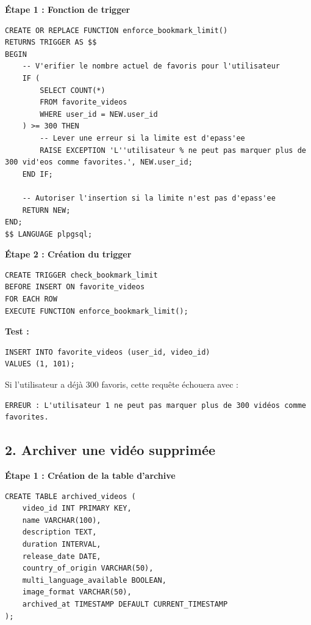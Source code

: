 \documentclass[a4paper, 12pt]{article}
\begin{document}
\textbf{Étape 1 : Fonction de trigger}

\begin{lstlisting}
CREATE OR REPLACE FUNCTION enforce_bookmark_limit()
RETURNS TRIGGER AS $$
BEGIN
    -- V'erifier le nombre actuel de favoris pour l'utilisateur
    IF (
        SELECT COUNT(*) 
        FROM favorite_videos 
        WHERE user_id = NEW.user_id
    ) >= 300 THEN
        -- Lever une erreur si la limite est d'epass'ee
        RAISE EXCEPTION 'L''utilisateur % ne peut pas marquer plus de 300 vid'eos comme favorites.', NEW.user_id;
    END IF;

    -- Autoriser l'insertion si la limite n'est pas d'epass'ee
    RETURN NEW;
END;
$$ LANGUAGE plpgsql;
\end{lstlisting}

\textbf{Étape 2 : Création du trigger}

\begin{lstlisting}
CREATE TRIGGER check_bookmark_limit
BEFORE INSERT ON favorite_videos
FOR EACH ROW
EXECUTE FUNCTION enforce_bookmark_limit();
\end{lstlisting}

\textbf{Test :}

\begin{lstlisting}
INSERT INTO favorite_videos (user_id, video_id)
VALUES (1, 101);
\end{lstlisting}

Si l'utilisateur a déjà 300 favoris, cette requête échouera avec :

\begin{verbatim}
ERREUR : L'utilisateur 1 ne peut pas marquer plus de 300 vidéos comme favorites.
\end{verbatim}

\subsection*{2. Archiver une vidéo supprimée}

\textbf{Étape 1 : Création de la table d'archive}

\begin{lstlisting}
CREATE TABLE archived_videos (
    video_id INT PRIMARY KEY,
    name VARCHAR(100),
    description TEXT,
    duration INTERVAL,
    release_date DATE,
    country_of_origin VARCHAR(50),
    multi_language_available BOOLEAN,
    image_format VARCHAR(50),
    archived_at TIMESTAMP DEFAULT CURRENT_TIMESTAMP
);
\end{lstlisting}
\end{document}
